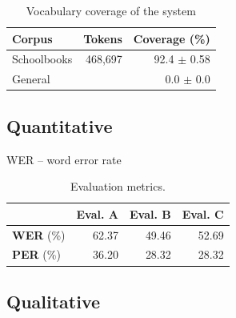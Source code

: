 \documentclass[a4paper,11pt,twocolumn]{article}
\begin{document}
\begin{table}
  \begin{center}
    \begin{tabular}{|l|r|r|}
      \hline
      \textbf{Corpus} & \textbf{Tokens} & \textbf{Coverage (\%)}  \\
      \hline
      Schoolbooks     & 468,697 & 92.4 $\pm$ 0.58 \\
      General         & & 0.0 $\pm$ 0.0 \\
      \hline
    \end{tabular}
    \label{table:coverage}
    \caption{Vocabulary coverage of the system}
  \end{center}
\end{table}

\subsection{Quantitative}



WER -- word error rate
\begin{table}
  \begin{center}
    \begin{tabular}{|l|r|r|r|}
      \hline
      & \textbf{Eval. A} & \textbf{Eval. B} & \textbf{Eval. C}  \\
      \hline
\textbf{WER} (\%) & 62.37  &  49.46  &  52.69 \\
\textbf{PER} (\%) &  36.20   &  28.32  &  28.32 \\
      \hline
    \end{tabular}
    \label{table:coverage}
    \caption{Evaluation metrics.}
  \end{center}
\end{table}

\subsection{Qualitative}
\end{document}

